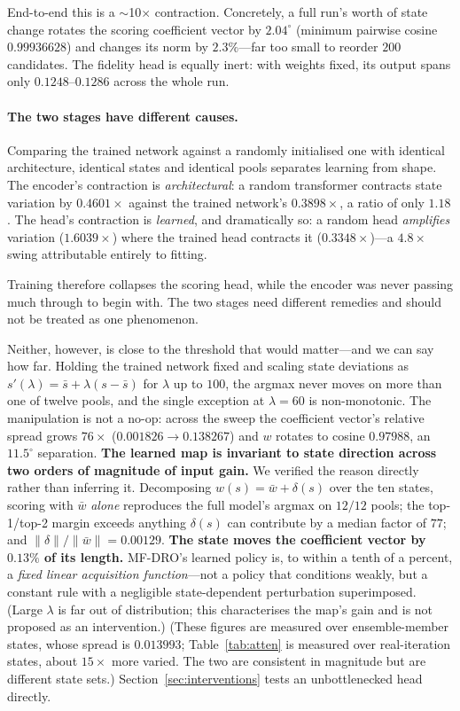 \documentclass[11pt]{article}
\begin{document}
End-to-end this is a $\sim$10$\times$ contraction. Concretely, a full run's
worth of state change rotates the scoring coefficient vector by $2.04^\circ$
(minimum pairwise cosine $0.99936628$) and changes its norm by $2.3\%$---far too
small to reorder $200$ candidates. The fidelity head is equally inert: with
weights fixed, its output spans only $0.1248$--$0.1286$ across the whole run.

\paragraph{The two stages have different causes.} Comparing the trained network
against a randomly initialised one with identical architecture, identical states
and identical pools separates learning from shape. The encoder's contraction is
\emph{architectural}: a random transformer contracts state variation by
$0.4601\times$ against the trained network's $0.3898\times$, a ratio of only
$1.18$. The head's contraction is \emph{learned}, and dramatically so: a random
head \emph{amplifies} variation ($1.6039\times$) where the trained head contracts
it ($0.3348\times$)---a $4.8\times$ swing attributable entirely to fitting.

Training therefore collapses the scoring head, while the encoder was never
passing much through to begin with. The two stages need different remedies and
should not be treated as one phenomenon.

Neither, however, is close to the threshold that would matter---and we can say
how far. Holding the trained network fixed and scaling state deviations as
$s'(\lambda) = \bar{s} + \lambda(s-\bar{s})$ for $\lambda$ up to $100$, the
argmax never moves on more than one of twelve pools, and the single exception at
$\lambda{=}60$ is non-monotonic. The manipulation is not a no-op: across the
sweep the coefficient vector's relative spread grows $76\times$
($0.001826 \to 0.138267$) and $w$ rotates to cosine $0.97988$, an $11.5^\circ$
separation. \textbf{The learned map is invariant to state direction across two
orders of magnitude of input gain.} We verified the reason directly rather than
inferring it. Decomposing $w(s) = \bar{w} + \delta(s)$ over the ten states,
scoring with $\bar{w}$ \emph{alone} reproduces the full model's argmax on
$12/12$ pools; the top-1/top-2 margin exceeds anything $\delta(s)$ can
contribute by a median factor of $77$; and
$\|\delta\|/\|\bar{w}\| = 0.00129$. \textbf{The state moves the coefficient
vector by $0.13\%$ of its length.} MF-DRO's learned policy is, to within a tenth
of a percent, a \emph{fixed linear acquisition function}---not a policy that
conditions weakly, but a constant rule with a negligible state-dependent
perturbation superimposed. (Large $\lambda$ is far out of distribution; this
characterises the map's gain and is not proposed as an intervention.)
(These figures are measured over ensemble-member states, whose spread is
$0.013993$; Table~\ref{tab:atten} is measured over real-iteration states, about
$15\times$ more varied. The two are consistent in magnitude but are different
state sets.) Section~\ref{sec:interventions} tests an unbottlenecked head
directly.
\end{document}
